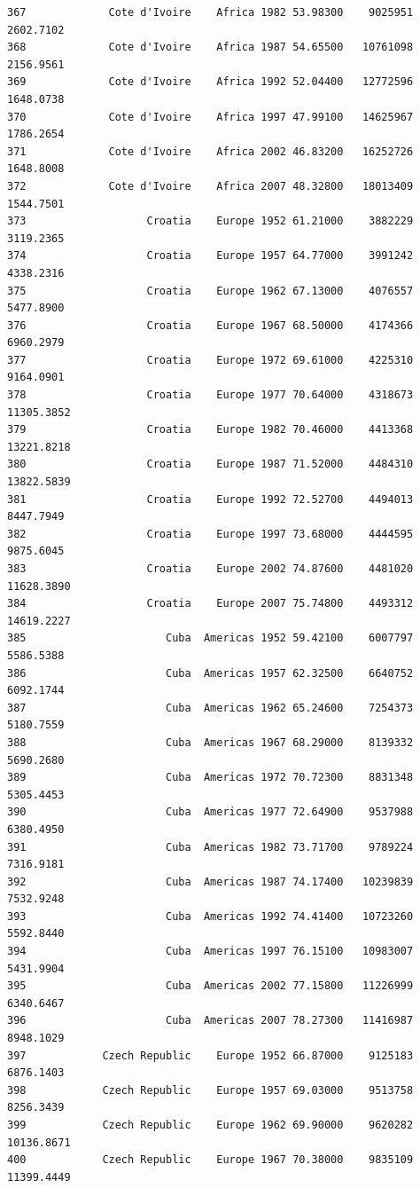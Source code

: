 \documentclass[
  letterpaper,
  DIV=11,
  numbers=noendperiod]{scrreprt}
\begin{document}
\begin{verbatim}
367             Cote d'Ivoire    Africa 1982 53.98300    9025951   2602.7102
368             Cote d'Ivoire    Africa 1987 54.65500   10761098   2156.9561
369             Cote d'Ivoire    Africa 1992 52.04400   12772596   1648.0738
370             Cote d'Ivoire    Africa 1997 47.99100   14625967   1786.2654
371             Cote d'Ivoire    Africa 2002 46.83200   16252726   1648.8008
372             Cote d'Ivoire    Africa 2007 48.32800   18013409   1544.7501
373                   Croatia    Europe 1952 61.21000    3882229   3119.2365
374                   Croatia    Europe 1957 64.77000    3991242   4338.2316
375                   Croatia    Europe 1962 67.13000    4076557   5477.8900
376                   Croatia    Europe 1967 68.50000    4174366   6960.2979
377                   Croatia    Europe 1972 69.61000    4225310   9164.0901
378                   Croatia    Europe 1977 70.64000    4318673  11305.3852
379                   Croatia    Europe 1982 70.46000    4413368  13221.8218
380                   Croatia    Europe 1987 71.52000    4484310  13822.5839
381                   Croatia    Europe 1992 72.52700    4494013   8447.7949
382                   Croatia    Europe 1997 73.68000    4444595   9875.6045
383                   Croatia    Europe 2002 74.87600    4481020  11628.3890
384                   Croatia    Europe 2007 75.74800    4493312  14619.2227
385                      Cuba  Americas 1952 59.42100    6007797   5586.5388
386                      Cuba  Americas 1957 62.32500    6640752   6092.1744
387                      Cuba  Americas 1962 65.24600    7254373   5180.7559
388                      Cuba  Americas 1967 68.29000    8139332   5690.2680
389                      Cuba  Americas 1972 70.72300    8831348   5305.4453
390                      Cuba  Americas 1977 72.64900    9537988   6380.4950
391                      Cuba  Americas 1982 73.71700    9789224   7316.9181
392                      Cuba  Americas 1987 74.17400   10239839   7532.9248
393                      Cuba  Americas 1992 74.41400   10723260   5592.8440
394                      Cuba  Americas 1997 76.15100   10983007   5431.9904
395                      Cuba  Americas 2002 77.15800   11226999   6340.6467
396                      Cuba  Americas 2007 78.27300   11416987   8948.1029
397            Czech Republic    Europe 1952 66.87000    9125183   6876.1403
398            Czech Republic    Europe 1957 69.03000    9513758   8256.3439
399            Czech Republic    Europe 1962 69.90000    9620282  10136.8671
400            Czech Republic    Europe 1967 70.38000    9835109  11399.4449

\end{verbatim}
\end{document}

